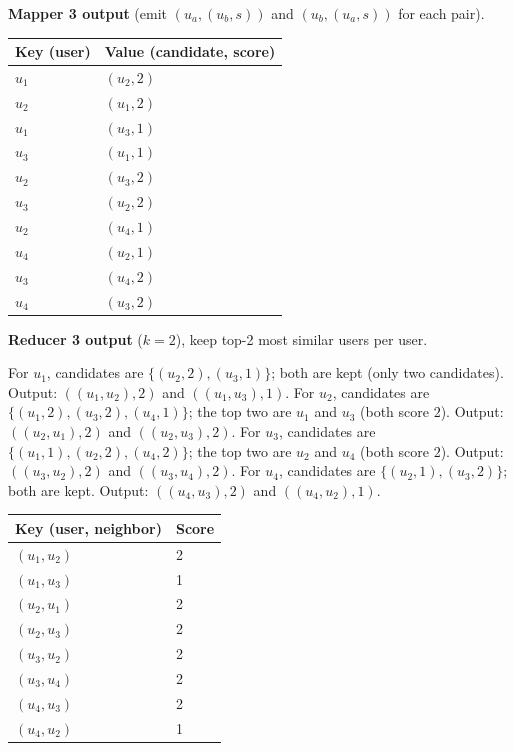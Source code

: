 \documentclass[a4paper,11pt]{article}
\begin{document}
\medskip

\textbf{Mapper 3 output} (emit $(u_a, (u_b, s))$ and $(u_b, (u_a, s))$ for each pair).

\begin{center}
\begin{tabular}{ll}
\toprule
\textbf{Key (user)} & \textbf{Value (candidate, score)} \\
\midrule
$u_1$ & $(u_2, 2)$ \\
$u_2$ & $(u_1, 2)$ \\
$u_1$ & $(u_3, 1)$ \\
$u_3$ & $(u_1, 1)$ \\
$u_2$ & $(u_3, 2)$ \\
$u_3$ & $(u_2, 2)$ \\
$u_2$ & $(u_4, 1)$ \\
$u_4$ & $(u_2, 1)$ \\
$u_3$ & $(u_4, 2)$ \\
$u_4$ & $(u_3, 2)$ \\
\bottomrule
\end{tabular}
\end{center}

\medskip

\textbf{Reducer 3 output} ($k = 2$), keep top-2 most similar users per user.

For $u_1$, candidates are $\{(u_2,2),(u_3,1)\}$; both are kept (only two candidates). Output: $((u_1, u_2), 2)$ and $((u_1, u_3), 1)$. For $u_2$, candidates are $\{(u_1,2),(u_3,2),(u_4,1)\}$; the top two are $u_1$ and $u_3$ (both score $2$). Output: $((u_2, u_1), 2)$ and $((u_2, u_3), 2)$. For $u_3$, candidates are $\{(u_1,1),(u_2,2),(u_4,2)\}$; the top two are $u_2$ and $u_4$ (both score $2$). Output: $((u_3, u_2), 2)$ and $((u_3, u_4), 2)$. For $u_4$, candidates are $\{(u_2,1),(u_3,2)\}$; both are kept. Output: $((u_4, u_3), 2)$ and $((u_4, u_2), 1)$.

\begin{center}
\begin{tabular}{ll}
\toprule
\textbf{Key (user, neighbor)} & \textbf{Score} \\
\midrule
$(u_1, u_2)$ & 2 \\
$(u_1, u_3)$ & 1 \\
$(u_2, u_1)$ & 2 \\
$(u_2, u_3)$ & 2 \\
$(u_3, u_2)$ & 2 \\
$(u_3, u_4)$ & 2 \\
$(u_4, u_3)$ & 2 \\
$(u_4, u_2)$ & 1 \\
\bottomrule
\end{tabular}
\end{center}
\end{document}
